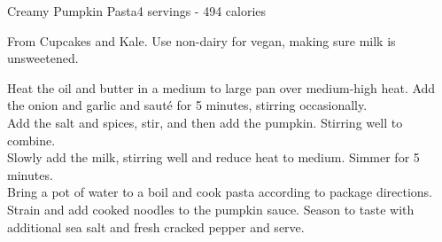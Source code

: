 \begin{recipe}{Creamy Pumpkin Pasta}{4 servings - 494 calories}{}

\freeform From Cupcakes and Kale. Use non-dairy for vegan, making sure milk is unsweetened.


Heat the oil and butter in a medium to large pan over medium-high heat. Add the onion and garlic and sauté for 5 minutes, stirring occasionally.\\

Add the salt and spices, stir, and then add the pumpkin. Stirring well to combine.\\

Slowly add the milk, stirring well and reduce heat to medium. Simmer for 5 minutes.\\

Bring a pot of water to a boil and cook pasta according to package directions. Strain and add cooked noodles to the pumpkin sauce. Season to taste with additional sea salt and fresh cracked pepper and serve.

\end{recipe}